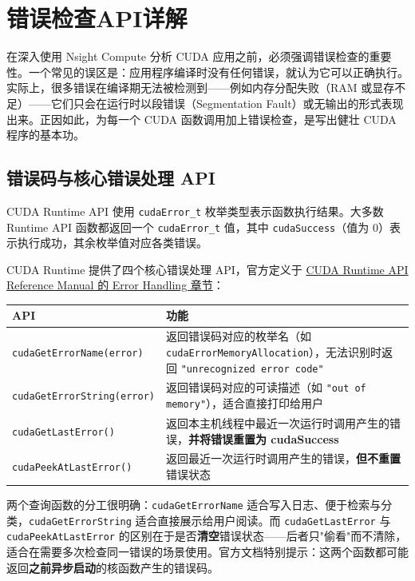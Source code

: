 \section{错误检查API详解}

在深入使用 Nsight Compute 分析 CUDA 应用之前，必须强调错误检查的重要性。一个常见的误区是：应用程序编译时没有任何错误，就认为它可以正确执行。实际上，很多错误在编译期无法被检测到——例如内存分配失败（RAM 或显存不足）——它们只会在运行时以段错误（Segmentation Fault）或无输出的形式表现出来。正因如此，为每一个 CUDA 函数调用加上错误检查，是写出健壮 CUDA 程序的基本功。

\subsection{错误码与核心错误处理 API}

CUDA Runtime API 使用 \texttt{cudaError\_t} 枚举类型表示函数执行结果。大多数 Runtime API 函数都返回一个 \texttt{cudaError\_t} 值，其中 \texttt{cudaSuccess}（值为 0）表示执行成功，其余枚举值对应各类错误。

CUDA Runtime 提供了四个核心错误处理 API，官方定义于 \href{https://docs.nvidia.com/cuda/cuda-runtime-api/group__CUDART__ERROR.html}{CUDA Runtime API Reference Manual 的 Error Handling 章节}：

\begin{center}
\begin{tabular}{|p{5.2cm}|p{7.2cm}|}
\hline
\textbf{API} & \textbf{功能} \\
\hline
\texttt{cudaGetErrorName(error)} & 返回错误码对应的枚举名（如 \texttt{cudaErrorMemoryAllocation}），无法识别时返回 \texttt{"unrecognized error code"} \\
\hline
\texttt{cudaGetErrorString(error)} & 返回错误码对应的可读描述（如 \texttt{"out of memory"}），适合直接打印给用户 \\
\hline
\texttt{cudaGetLastError()} & 返回本主机线程中最近一次运行时调用产生的错误，\textbf{并将错误重置为 cudaSuccess} \\
\hline
\texttt{cudaPeekAtLastError()} & 返回最近一次运行时调用产生的错误，\textbf{但不重置}错误状态 \\
\hline
\end{tabular}
\end{center}

两个查询函数的分工很明确：\texttt{cudaGetErrorName} 适合写入日志、便于检索与分类，\texttt{cudaGetErrorString} 适合直接展示给用户阅读。而 \texttt{cudaGetLastError} 与 \texttt{cudaPeekAtLastError} 的区别在于是否\textbf{清空}错误状态——后者只"偷看"而不清除，适合在需要多次检查同一错误的场景使用。官方文档特别提示：这两个函数都可能返回\textbf{之前异步启动}的核函数产生的错误码。

